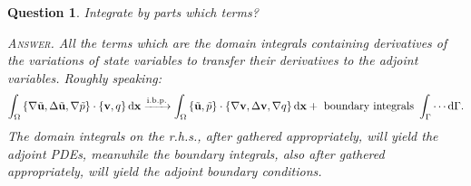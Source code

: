 \documentclass[oneside]{book}
\numberwithin{equation}{section}
\newtheorem{question}{Question}[section]
\begin{document}
\begin{question}
    Integrate by parts which terms?
    
    \textsc{Answer.} All the terms which are the domain integrals containing derivatives of the variations of state variables to transfer their derivatives to the adjoint variables. Roughly speaking:
    \begin{align*}
        \int_\Omega \left\{\nabla\tilde{\bf u},\Delta\tilde{\bf u},\nabla\tilde{p}\right\}\cdot\left\{{\bf v},q\right\}{\rm d}{\bf x}\xrightarrow{\rm i.b.p.}\int_\Omega \left\{\tilde{\bf u},\tilde{p}\right\}\cdot\left\{\nabla{\bf v},\Delta{\bf v},\nabla q\right\}{\rm d}{\bf x} + \mbox{ boundary integrals } \int_\Gamma \cdots{\rm d}\Gamma.
    \end{align*}
    The domain integrals on the r.h.s., after gathered appropriately, will yield the adjoint PDEs, meanwhile the boundary integrals, also after gathered appropriately, will yield the adjoint boundary conditions.
\end{question}
\end{document}

